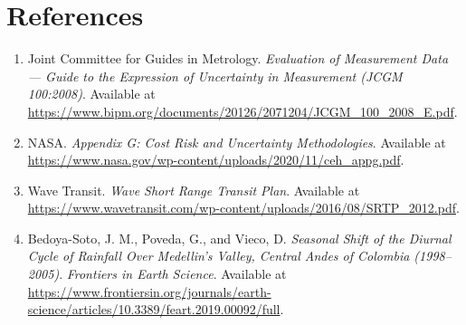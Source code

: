 \documentclass[11pt]{article}
\begin{document}
	\section*{References}
	
	\begin{enumerate}[leftmargin=*]
		\item Joint Committee for Guides in Metrology. \emph{Evaluation of Measurement Data --- Guide to the Expression of Uncertainty in Measurement (JCGM 100:2008)}. Available at \url{https://www.bipm.org/documents/20126/2071204/JCGM_100_2008_E.pdf}.
		
		\item NASA. \emph{Appendix G: Cost Risk and Uncertainty Methodologies}. Available at \url{https://www.nasa.gov/wp-content/uploads/2020/11/ceh_appg.pdf}.
		
		\item Wave Transit. \emph{Wave Short Range Transit Plan}. Available at \url{https://www.wavetransit.com/wp-content/uploads/2016/08/SRTP_2012.pdf}.
		
		\item Bedoya-Soto, J. M., Poveda, G., and Vieco, D. \emph{Seasonal Shift of the Diurnal Cycle of Rainfall Over Medellin's Valley, Central Andes of Colombia (1998--2005)}. \emph{Frontiers in Earth Science}. Available at \url{https://www.frontiersin.org/journals/earth-science/articles/10.3389/feart.2019.00092/full}.
	\end{enumerate}
	
\end{document}
